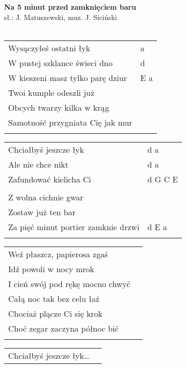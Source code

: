 \documentclass[a5paper]{article}
\begin{document}


\noindent
\fontsize{12pt}{15pt}\selectfont
\textbf{Na 5 minut przed zamknięciem baru} \\
\fontsize{8pt}{10pt}\selectfont
sł.: J. Matuszewski, muz. J. Siciński \\ \\
\fontsize{10pt}{12pt}\selectfont
{}
\begin{tabular}{@{}p{8.00cm}p{3cm}@{}}
\noindent
Wysączyłeś ostatni łyk & a \\
W pustej szklance świeci dno & d \\
W kieszeni masz tylko parę dziur & E a \\
Twoi kumple odeszli już \\
Obcych twarzy kilka w krąg \\
Samotność przygniata Cię jak mur \\ \\
\end{tabular}

\noindent
\begin{tabular}{@{}p{7.00cm}p{3cm}@{}}
Chciałbyś jeszcze łyk & d a \\
Ale nie chce nikt & d a \\
Zafundować kielicha Ci & d G C E \\ \\
Z wolna cichnie gwar \\
Zostaw już ten bar \\
Za pięć minut portier zamknie drzwi & d E a \\ \\
\end{tabular}

\noindent
\begin{tabular}{@{}p{7.00cm}p{3cm}@{}}
Weź płaszcz, papierosa zgaś \\
Idź powoli w nocy mrok \\
I cień swój pod rękę mocno chwyć\\
Całą noc tak bez celu łaź\\
Chociaż plącze Ci się krok\\
Choć zegar zaczyna północ bić\\\\
\end{tabular}

\noindent
\begin{tabular}{@{}p{7.00cm}p{3cm}@{}}
Chciałbyś jeszcze łyk…
\end{tabular}
\end{document}
